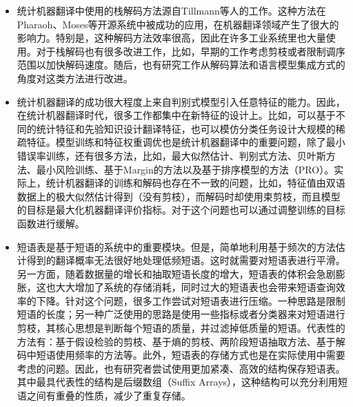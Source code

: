 \begin{itemize}
\vspace{0.5em}
\item 统计机器翻译中使用的栈解码方法源自Tillmann等人的工作。这种方法在Pharaoh、Moses等开源系统中被成功的应用，在机器翻译领域产生了很大的影响力。特别是，这种解码方法效率很高，因此在许多工业系统里也大量使用。对于栈解码也有很多改进工作，比如，早期的工作考虑剪枝或者限制调序范围以加快解码速度。随后，也有研究工作从解码算法和语言模型集成方式的角度对这类方法进行改进。
\vspace{0.5em}
\item 统计机器翻译的成功很大程度上来自判别式模型引入任意特征的能力。因此，在统计机器翻译时代，很多工作都集中在新特征的设计上。比如，可以基于不同的统计特征和先验知识设计翻译特征，也可以模仿分类任务设计大规模的稀疏特征。模型训练和特征权重调优也是统计机器翻译中的重要问题，除了最小错误率训练，还有很多方法，比如，最大似然估计、判别式方法、贝叶斯方法、最小风险训练、基于Margin的方法以及基于排序模型的方法（PRO）。实际上，统计机器翻译的训练和解码也存在不一致的问题，比如，特征值由双语数据上的极大似然估计得到（没有剪枝），而解码时却使用束剪枝，而且模型的目标是最大化机器翻译评价指标。对于这个问题也可以通过调整训练的目标函数进行缓解。
\vspace{0.5em}
\item 短语表是基于短语的系统中的重要模块。但是，简单地利用基于频次的方法估计得到的翻译概率无法很好地处理低频短语。这时就需要对短语表进行平滑。另一方面，随着数据量的增长和抽取短语长度的增大，短语表的体积会急剧膨胀，这也大大增加了系统的存储消耗，同时过大的短语表也会带来短语查询效率的下降。针对这个问题，很多工作尝试对短语表进行压缩。一种思路是限制短语的长度；另一种广泛使用的思路是使用一些指标或者分类器来对短语进行剪枝，其核心思想是判断每个短语的质量，并过滤掉低质量的短语。代表性的方法有：基于假设检验的剪枝、基于熵的剪枝、两阶段短语抽取方法、基于解码中短语使用频率的方法等。此外，短语表的存储方式也是在实际使用中需要考虑的问题。因此，也有研究者尝试使用更加紧凑、高效的结构保存短语表。其中最具代表性的结构是后缀数组（Suffix Arrays），这种结构可以充分利用短语之间有重叠的性质，减少了重复存储。
\vspace{0.5em}
\end{itemize}











